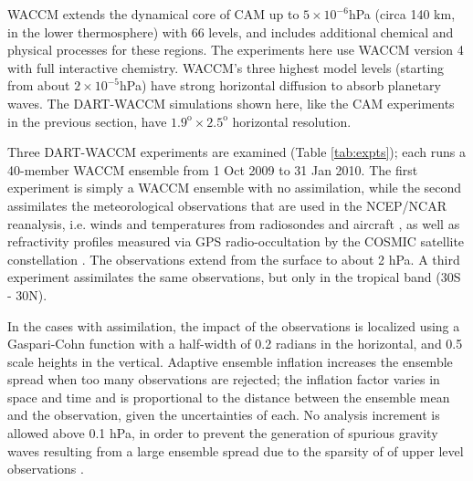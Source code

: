WACCM extends the dynamical core of CAM up to $5 \times 10^{-6}$hPa (circa 140 km, in the lower thermosphere) with 66 levels, and includes additional chemical and physical processes for these regions. 
The experiments here use WACCM version 4 with full interactive chemistry.
WACCM's three highest model levels (starting from about $2 \times 10^{-5}$hPa) have strong horizontal diffusion to absorb planetary waves. 
The DART-WACCM simulations shown here, like the CAM experiments in the previous section, have $1.9^{\text{o}} \times 2.5^{\text{o}}$ horizontal resolution.


Three DART-WACCM experiments are examined (Table \ref{tab:expts}); 
each runs a 40-member WACCM ensemble from 1 Oct 2009 to 31 Jan 2010. 
The first experiment is simply a WACCM ensemble with no assimilation, while the second 
assimilates the meteorological observations that are used in the NCEP/NCAR reanalysis, i.e. winds and temperatures from radiosondes and aircraft \citep{Saha2010}, as well as refractivity profiles measured via GPS radio-occultation by the COSMIC satellite constellation \citep{Anthes2008}.
The observations extend from the surface to about 2 hPa. 
A third experiment assimilates the same observations, but only in the tropical band (30S - 30N). 

In the cases with assimilation, the impact of the observations is localized using a  
Gaspari-Cohn function \citep{Gaspari1999} with a half-width of 0.2 radians in the horizontal, and 0.5 scale heights in the vertical.  
Adaptive ensemble inflation \citep{Anderson2009tellus} increases the ensemble spread when too many observations are rejected; the inflation factor varies in space and time and is proportional to the distance between the ensemble mean and the observation, given the uncertainties of each.  
No analysis increment is allowed above 0.1 hPa, in order to prevent the generation of spurious gravity waves resulting from a large ensemble spread due to the sparsity of of upper level observations \citep{Polavarapu2005b}. 

